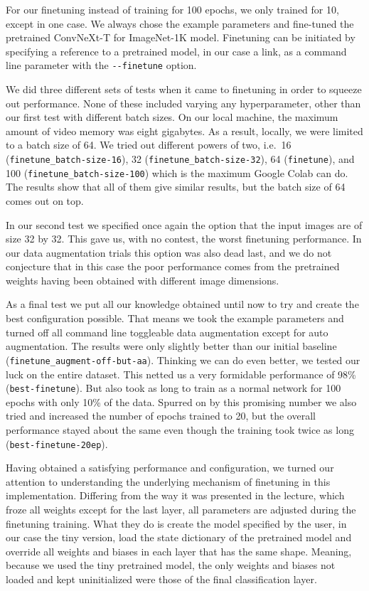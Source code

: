 \documentclass{article}
\begin{document}
For our finetuning instead of training for 100 epochs, we only trained for 10, except in one case.
We always chose the example parameters and fine-tuned the pretrained ConvNeXt-T for ImageNet-1K model\cite{repository}.
Finetuning can be initiated by specifying a reference to a pretrained model, in our case a link, as a command line parameter with the \verb|--finetune| option.

We did three different sets of tests when it came to finetuning in order to squeeze out performance.
None of these included varying any hyperparameter, other than our first test with different batch sizes.
On our local machine, the maximum amount of video memory was eight gigabytes.
As a result, locally, we were limited to a batch size of 64.
We tried out different powers of two, i.e.\ 16 (\texttt{finetune\_batch-size-16}), 32 (\texttt{finetune\_batch-size-32}), 64 (\texttt{finetune}), and 100 (\texttt{finetune\_batch-size-100}) which is the maximum Google Colab can do.
The results show that all of them give similar results, but the batch size of 64 comes out on top.

In our second test we specified once again the option that the input images are of size 32 by 32.
This gave us, with no contest, the worst finetuning performance.
In our data augmentation trials this option was also dead last, and we do not conjecture that in this case the poor performance comes from the pretrained weights having been obtained with different image dimensions.

As a final test we put all our knowledge obtained until now to try and create the best configuration possible.
That means we took the example parameters and turned off all command line toggleable data augmentation except for auto augmentation.
The results were only slightly better than our initial baseline (\texttt{finetune\_augment-off-but-aa}).
Thinking we can do even better, we tested our luck on the entire dataset.
This netted us a very formidable performance of 98\% (\texttt{best-finetune}).
But also took as long to train as a normal network for 100 epochs with only 10\% of the data.
Spurred on by this promising number we also tried and increased the number of epochs trained to 20, but the overall performance stayed about the same even though the training took twice as long (\texttt{best-finetune-20ep}).

Having obtained a satisfying performance and configuration, we turned our attention to understanding the underlying mechanism of finetuning in this implementation.
Differing from the way it was presented in the lecture, which froze all weights except for the last layer, all parameters are adjusted during the finetuning training.
What they do is create the model specified by the user, in our case the tiny version, load the state dictionary of the pretrained model and override all weights and biases in each layer that has the same shape.
Meaning, because we used the tiny pretrained model, the only weights and biases not loaded and kept uninitialized were those of the final classification layer.
\end{document}
